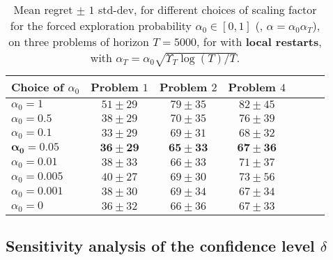 \begin{table}[ht]
    \centering
    \begin{tabular}{l|cccccc}
        \textbf{Choice of} $\alpha_0$ & Problem $1$ & Problem $2$ & Problem $4$ \\
        \hline
        $\alpha_0=1$     & $51 \pm 29$ & $79 \pm 35$ & $82 \pm 45$ \\
        $\alpha_0=0.5$   & $38 \pm 29$ & $70 \pm 35$ & $76 \pm 39$ \\
        $\alpha_0=0.1$   & $33 \pm 29$ & $69 \pm 31$ & $68 \pm 32$ \\
        $\mathbf{\alpha_0=0.05}$  & $\mathbf{36 \pm 29}$ & $\mathbf{65 \pm 33}$ & $\mathbf{67 \pm 36}$ \\
        $\alpha_0=0.01$  & $38 \pm 33$ & $66 \pm 33$ & $71 \pm 37$ \\
        $\alpha_0=0.005$ & $40 \pm 27$ & $69 \pm 30$ & $73 \pm 56$ \\
        $\alpha_0=0.001$ & $38 \pm 30$ & $69 \pm 34$ & $67 \pm 34$ \\
        $\alpha_0=0$     & $36 \pm 32$ & $66 \pm 36$ & $67 \pm 33$
    \end{tabular}
    \caption{Mean regret $\pm$ $1$ std-dev, for different choices of scaling factor for the forced exploration probability $\alpha_0\in[0,1]$ (\ie, $\alpha=\alpha_0 \alpha_T$), on three problems of horizon $T=5000$, for \GLRklUCB{} with \textbf{local restarts}, with $\alpha_T = \alpha_0\sqrt{\Upsilon_T \log(T)/T}$.}
    \label{table:6:sensibilityAlpha0}
\end{table}


\subsection{Sensitivity analysis of the confidence level $\delta$}\label{sec:6:choosingDelta}

